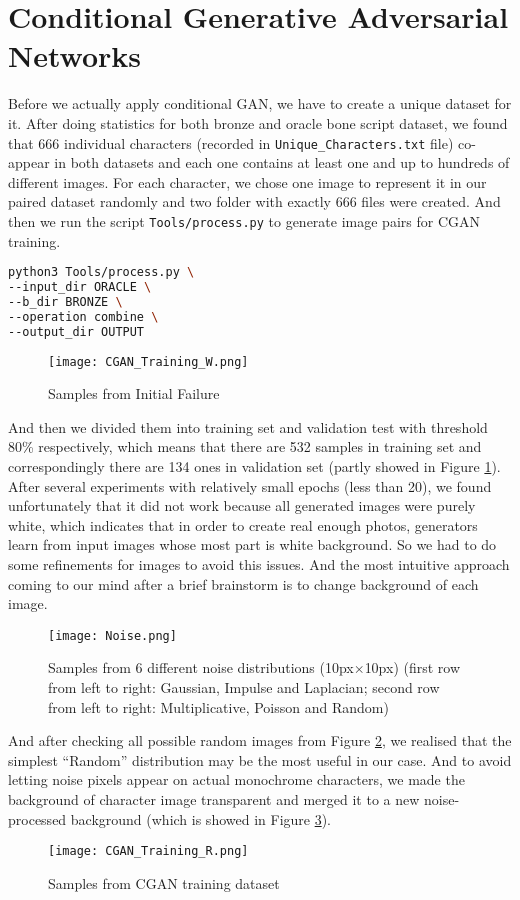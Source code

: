 \section{Conditional Generative Adversarial Networks}
Before we actually apply conditional GAN, we have to create a unique dataset for it. After doing statistics for both bronze and oracle bone script dataset, we found that 666 individual characters (recorded in \texttt{Unique\_Characters.txt} file) co-appear in both datasets and each one contains at least one and up to hundreds of different images. For each character, we chose one image to represent it in our paired dataset randomly and two folder with exactly 666 files were created. And then we run the script \texttt{Tools/process.py} to generate image pairs for CGAN training.
\begin{lstlisting}[language = bash, caption = Image Pair Generation]
python3 Tools/process.py \
--input_dir ORACLE \
--b_dir BRONZE \
--operation combine \
--output_dir OUTPUT
\end{lstlisting}
\begin{figure}[h]
	\centering
	\texttt{[image: CGAN\_Training\_W.png]}
	\caption{Samples from Initial Failure}
	\label{fig:failure}
\end{figure}
And then we divided them into training set and validation test with threshold 80\% respectively, which means that there are 532 samples in training set and correspondingly there are 134 ones in validation set (partly showed in Figure \ref{fig:failure}). After several experiments with relatively small epochs (less than 20), we found unfortunately that it did not work because all generated images were purely white, which indicates that in order to create real enough photos, generators learn from input images whose most part is white background. So we had to do some refinements for images to avoid this issues. And the most intuitive approach coming to our mind after a brief brainstorm is to change background of each image.
\begin{figure}[h]
	\centering
	\texttt{[image: Noise.png]}
	\caption{Samples from 6 different noise distributions (10px$ \times $10px) (first row from left to right: Gaussian, Impulse and Laplacian; second row from left to right: Multiplicative, Poisson and Random)}
	\label{fig:noise}
\end{figure}
And after checking all possible random images from Figure \ref{fig:noise}, we realised that the simplest ``Random'' distribution may be the most useful in our case. And to avoid letting noise pixels appear on actual monochrome characters, we made the background of character image transparent and merged it to a new noise-processed background (which is showed in Figure \ref{fig:CGAN_training}).
\begin{figure}[h]
	\centering
	\texttt{[image: CGAN\_Training\_R.png]}
	\caption{Samples from CGAN training dataset}
	\label{fig:CGAN_training}
\end{figure}

